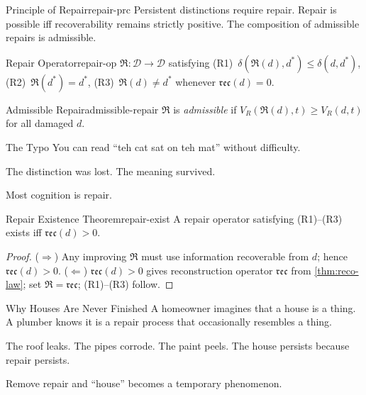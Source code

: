 \documentclass[12pt,twoside,openright]{book}
\newcommand{\repair}{\mathfrak{R}}
\newcommand{\reco}{\mathfrak{rec}}
\begin{document}
\begin{principle}{Principle of Repair}{repair-prc}
  Persistent distinctions require repair. Repair is
  possible iff recoverability remains strictly positive.
  The composition of admissible repairs is admissible.
\end{principle}

\begin{definition}{Repair Operator}{repair-op}
  $\repair:\mathcal{D}\to\mathcal{D}$ satisfying
  (R1)~$\delta(\repair(d),d^*)\le\delta(d,d^*)$,
  (R2)~$\repair(d^*)=d^*$,
  (R3)~$\repair(d)\ne d^*$ whenever $\reco(d)=0$.
\end{definition}

\begin{definition}{Admissible Repair}{admissible-repair}
  $\repair$ is \emph{admissible} if
  $V_R(\repair(d),t)\ge V_R(d,t)$ for all damaged $d$.
\end{definition}

\begin{distinctionaside}{The Typo}
You can read ``teh cat sat on teh mat'' without difficulty.

The distinction was lost. The meaning survived.

Most cognition is repair.
\end{distinctionaside}

\begin{theorem}{Repair Existence Theorem}{repair-exist}
  A repair operator satisfying (R1)--(R3) exists iff
  $\reco(d)>0$.
\end{theorem}
\begin{proof}
  ($\Rightarrow$) Any improving $\repair$ must use
  information recoverable from $d$; hence $\reco(d)>0$.
  ($\Leftarrow$) $\reco(d)>0$ gives reconstruction
  operator $\mathfrak{rec}$ from \cref{thm:reco-law};
  set $\repair=\mathfrak{rec}$; (R1)--(R3) follow.
\end{proof}

\begin{distinctionaside}{Why Houses Are Never Finished}
A homeowner imagines that a house is a thing. A plumber
knows it is a repair process that occasionally resembles a
thing.

The roof leaks. The pipes corrode. The paint peels. The
house persists because repair persists.

Remove repair and ``house'' becomes a temporary phenomenon.
\end{distinctionaside}
\end{document}
